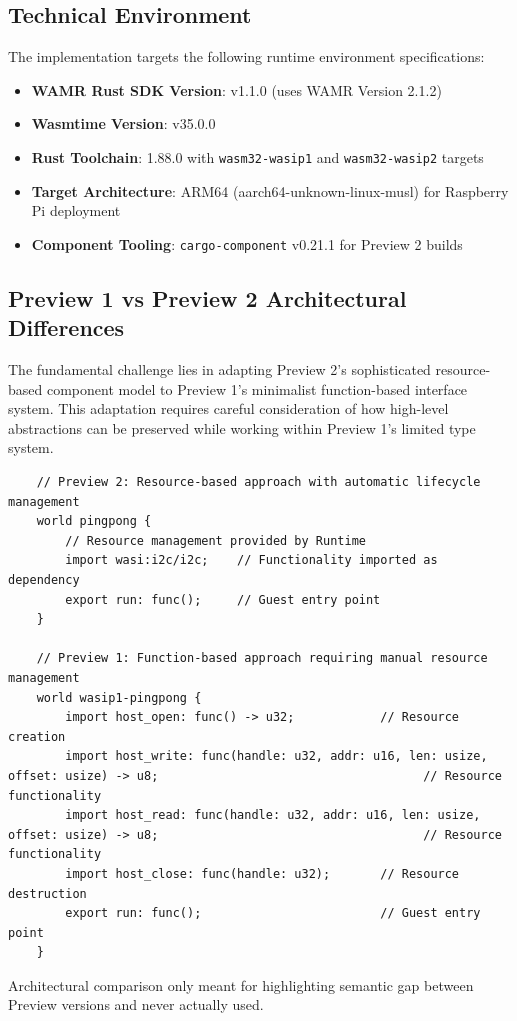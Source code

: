 \subsection{Technical Environment}

The implementation targets the following runtime environment specifications:

\begin{itemize}
    \item \textbf{WAMR Rust SDK Version}: v1.1.0 (uses WAMR Version 2.1.2)
    \item \textbf{Wasmtime Version}: v35.0.0
    \item \textbf{Rust Toolchain}: 1.88.0 with \texttt{wasm32-wasip1} and \texttt{wasm32-wasip2} targets
    \item \textbf{Target Architecture}: ARM64 (aarch64-unknown-linux-musl) for Raspberry Pi deployment
    \item \textbf{Component Tooling}: \texttt{cargo-component} v0.21.1 for Preview 2 builds
\end{itemize}

\subsection{Preview 1 vs Preview 2 Architectural Differences}

The fundamental challenge lies in adapting Preview 2's sophisticated resource-based component model to Preview 1's minimalist function-based interface system. This adaptation requires careful consideration of how high-level abstractions can be preserved while working within Preview 1's limited type system.

\begin{listing}[H]
    \begin{verbatim}
    // Preview 2: Resource-based approach with automatic lifecycle management
    world pingpong {
        // Resource management provided by Runtime
        import wasi:i2c/i2c;    // Functionality imported as dependency
        export run: func();     // Guest entry point
    }
    
    // Preview 1: Function-based approach requiring manual resource management
    world wasip1-pingpong {
        import host_open: func() -> u32;            // Resource creation
        import host_write: func(handle: u32, addr: u16, len: usize, offset: usize) -> u8;                                     // Resource functionality
        import host_read: func(handle: u32, addr: u16, len: usize, offset: usize) -> u8;                                     // Resource functionality
        import host_close: func(handle: u32);       // Resource destruction
        export run: func();                         // Guest entry point
    }
    \end{verbatim}
    \caption{Architectural comparison only meant for highlighting semantic gap between Preview versions and never actually used.}
    \label{lst:preview-comparison}
\end{listing}

